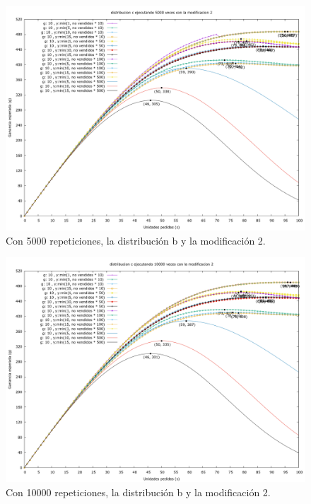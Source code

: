 \documentclass[12pt, spanish]{article}
\begin{document}
\begin{figure}[H]
	\centering
	\includegraphics[scale = 0.3]{prob_c/datos_c_5000_2.png}
	\caption{Con 5000 repeticiones, la distribución b y la modificación 2.}
	\label{fig:ej1_a_5000}

\end{figure}


\begin{figure}[H]
	\centering
	\includegraphics[scale = 0.3]{prob_c/datos_c_10000_2.png}
	\caption{Con 10000 repeticiones, la distribución b y la modificación 2.}
	\label{fig:ej1_a_10000}

\end{figure}
\end{document}
